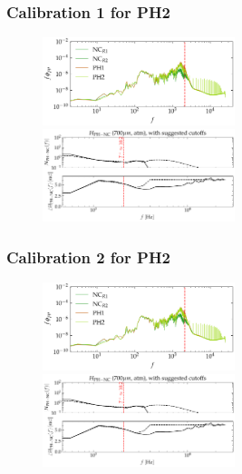\documentclass[aspectratio=169,9pt]{beamer}
\begin{document}
\begin{frame}
  \frametitle{Calibration 1 for PH2}
  \begin{figure}
    \centering
    \includegraphics[width=0.5\textwidth]{tf_calib/700_atm_calib_spec.png}
    \includegraphics[width=0.5\textwidth]{tf_calib/700_atm_H.pdf}
  \end{figure}
\end{frame}

\begin{frame}
  \frametitle{Calibration 2 for PH2}
  \begin{figure}
    \centering
    \includegraphics[width=0.5\textwidth]{tf_calib/700_atm_calib_spec_a2.png}
    \includegraphics[width=0.5\textwidth]{tf_calib/700_atm_H_a2.pdf}
  \end{figure}
\end{frame}
\end{document}
